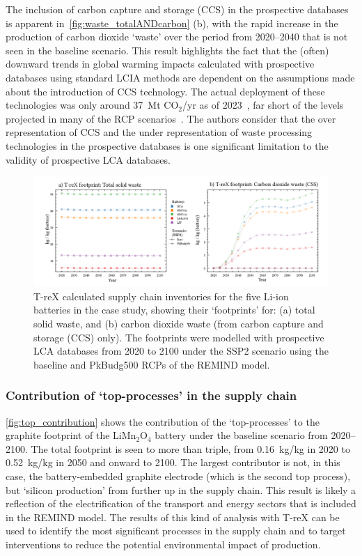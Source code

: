 The inclusion of carbon capture and storage (CCS) in the prospective databases is apparent in~\autoref{fig:waste_totalANDcarbon} (b), with the rapid increase in the production of carbon dioxide `waste' over the period from 2020--2040 that is not seen in the baseline scenario. This result highlights the fact that the (often) downward trends in global warming impacts calculated with prospective databases using standard LCIA methods are dependent on the assumptions made about the introduction of CCS technology. The actual deployment of these technologies was only around 37~Mt CO$_2$/yr as of 2023~\citep{dziejarski2023ccs}, far short of the levels projected in many of the RCP scenarios~\citep{sacchi2023premisedocs}. The authors consider that the over representation of CCS and the under representation of waste processing technologies in the prospective databases is one significant limitation to the validity of prospective LCA databases.

\begin{figure}[H]
    \centering
    \includegraphics[width=16cm]{figures/T-reX-wastefootprint-totalANDcarbon.pdf}
    \caption{T-reX calculated supply chain inventories for the five Li-ion batteries in the case study, showing their `footprints' for: (a) total solid waste, and (b) carbon dioxide waste (from carbon capture and storage (CCS) only). The footprints were modelled with prospective LCA databases from 2020 to 2100 under the SSP2 scenario using the baseline and PkBudg500 RCPs of the REMIND model.}\label{fig:waste_totalANDcarbon}
\end{figure}

\subsubsection{Contribution of `top-processes' in the supply chain}%

\autoref{fig:top_contribution} shows the contribution of the `top-processes' to the graphite footprint of the  LiMn\(_2\)O\(_4\) battery under the baseline scenario from 2020--2100. The total footprint is seen to more than triple, from 0.16~kg/kg in 2020 to 0.52~kg/kg in 2050 and onward to 2100. The largest contributor is not, in this case, the battery-embedded graphite electrode (which is the second top process), but `silicon production' from further up in the supply chain. This result is likely a reflection of the electrification of the transport and energy sectors that is included in the REMIND model. The results of this kind of analysis with T-reX can be used to identify the most significant processes in the supply chain and to target interventions to reduce the potential environmental impact of production.

